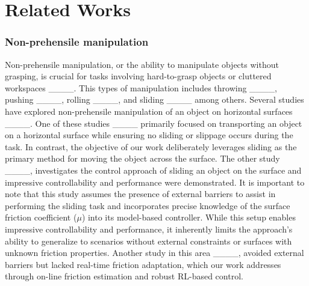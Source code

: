 \section{Related Works}
\subsubsection{\textbf{Non-prehensile manipulation}} Non-prehensile manipulation, or the ability to manipulate objects without grasping, is crucial for tasks involving hard-to-grasp objects or cluttered workspaces ____. This types of manipulation includes throwing ____, pushing ____, rolling ____, and sliding ____ among others. Several studies have explored non-prehensile manipulation of an object on horizontal surfaces ____. One of these studies ____ primarily focused on transporting an object on a horizontal surface while ensuring no sliding or slippage occurs during the task. In contrast, the objective of our work deliberately leverages sliding as the primary method for moving the object across the surface. The other study ____, investigates the control approach of sliding an object on the surface and impressive controllability and performance were demonstrated. It is important to note that this study assumes the presence of external barriers to assist in performing the sliding task and incorporates precise knowledge of the surface friction coefficient (\textit{$\mu$}) into its model-based controller. While this setup enables impressive controllability and performance, it inherently limits the approach's ability to generalize to scenarios without external constraints or surfaces with unknown friction properties. Another study in this area ____, avoided external barriers but lacked real-time friction adaptation, which our work addresses through on-line friction estimation and robust RL-based control.




